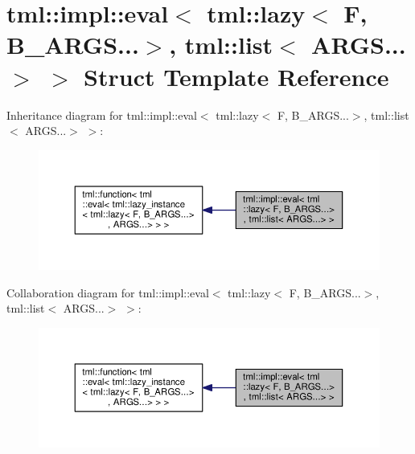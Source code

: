 \hypertarget{structtml_1_1impl_1_1eval_3_01tml_1_1lazy_3_01_f_00_01_b___a_r_g_s_8_8_8_4_00_01tml_1_1list_3_01_a_r_g_s_8_8_8_4_01_4}{\section{tml\+:\+:impl\+:\+:eval$<$ tml\+:\+:lazy$<$ F, B\+\_\+\+A\+R\+G\+S...$>$, tml\+:\+:list$<$ A\+R\+G\+S...$>$ $>$ Struct Template Reference}
\label{structtml_1_1impl_1_1eval_3_01tml_1_1lazy_3_01_f_00_01_b___a_r_g_s_8_8_8_4_00_01tml_1_1list_3_01_a_r_g_s_8_8_8_4_01_4}
}


Inheritance diagram for tml\+:\+:impl\+:\+:eval$<$ tml\+:\+:lazy$<$ F, B\+\_\+\+A\+R\+G\+S...$>$, tml\+:\+:list$<$ A\+R\+G\+S...$>$ $>$\+:
\nopagebreak
\begin{figure}[H]
\begin{center}
\leavevmode
\includegraphics[width=350pt]{structtml_1_1impl_1_1eval_3_01tml_1_1lazy_3_01_f_00_01_b___a_r_g_s_8_8_8_4_00_01tml_1_1list_3_016b52afe0e48d28d18d1bcb16636d1731}
\end{center}
\end{figure}


Collaboration diagram for tml\+:\+:impl\+:\+:eval$<$ tml\+:\+:lazy$<$ F, B\+\_\+\+A\+R\+G\+S...$>$, tml\+:\+:list$<$ A\+R\+G\+S...$>$ $>$\+:
\nopagebreak
\begin{figure}[H]
\begin{center}
\leavevmode
\includegraphics[width=350pt]{structtml_1_1impl_1_1eval_3_01tml_1_1lazy_3_01_f_00_01_b___a_r_g_s_8_8_8_4_00_01tml_1_1list_3_01bf658805e0d37d1cff9bc0660ca34d1c}
\end{center}
\end{figure}
